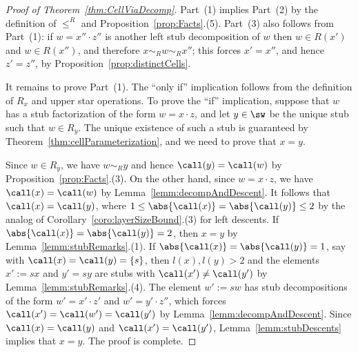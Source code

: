 \begin{proof}[Proof of Theorem~\ref{thm:CellViaDecomp}]
    Part~(1) implies Part~(2) by the definition of $\le^R$ and Proposition~\ref{prop:Facts}.(5). Part~(3) also
    follows from Part~(1): if $w=x''\cdot z''$ is another left stub decomposition of $w$ then $w\in
    R(x')$ and $w\in R(x'')$, and therefore $x\sim_R w\sim_R x''$; this forces $x'=x''$, and hence
    $z'=z''$, by Proposition~\ref{prop:distinctCells}.

    It remains to prove Part~(1). The ``only if'' implication follows from the definition of $R_x$
    and upper star operations. To prove the ``if'' implication, suppose that $w$ has a stub
    factorization of the form $w=x\cdot z$, and let $y\in \sw$ be the unique stub such that $w\in
    R_y$. The unique existence of such a stub is guaranteed by Theorem~\ref{thm:cellParameterization}, and
    we need to prove that $x=y$.

    Since $w\in R_y$, we have $w\sim_R y$ and hence  $\call(y)=\call(w)$ by Proposition~\ref{prop:Facts}.(3).
    On the other hand, since $w=x\cdot z$, we have $\call(x)=\call(w)$ by
    Lemma~\ref{lemm:decompAndDescent}. It follows that $\call(x)=\call(y)$, where $1\le
    \abs{\call(x)}=\abs{\call(y)}\le 2$ by the analog of Corollary~\ref{coro:layerSizeBound}.(3) for left
    descents. If $\abs{\call(x)}=\abs{\call(y)}=2$, then $x=y$ by Lemma~\ref{lemm:stubRemarks}.(1).  If
    $\abs{\call(x)}=\abs{\call(y)}=1$, say with $\call(x)=\call(y)=\{s\}$, then $l(x),l(y)>2$ and
    the elements $x':=sx$ and $y'=sy$ are stubs with $\call(x')\neq \call(y')$ by
    Lemma~\ref{lemm:stubRemarks}.(4). The element $w':=sw$ has stub decompositions of the form
    $w'=x'\cdot z'$ and $w'=y'\cdot z''$, which forces $\call(x')=\call(w')=\call(y')$ by
    Lemma~\ref{lemm:decompAndDescent}. Since $\call(x)=\call(y)$ and $\call(x')=\call(y')$,
    Lemma~\ref{lemm:stubDescents} implies that $x=y$.  The proof is complete.  
\end{proof}

